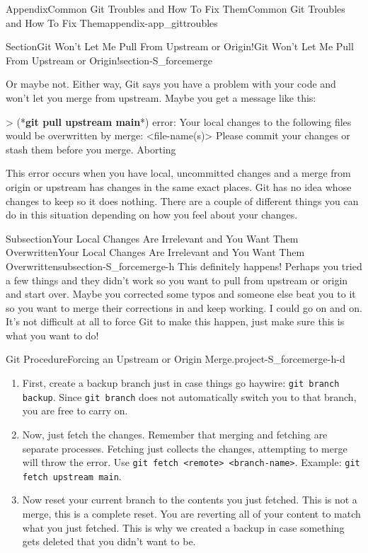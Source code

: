 \documentclass[oneside,10pt,]{book}
\newcommand{\mono}[1]{\texttt{#1}}
\newcommand{\consoleinput}[1]{\textbf{#1}}
\begin{document}
\begin{appendixptx}{Appendix}{Common Git Troubles and How To Fix Them}{}{Common Git Troubles and How To Fix Them}{}{}{appendix-app_gittroubles}
\begin{sectionptx}{Section}{Git Won't Let Me Pull From Upstream or Origin!}{}{Git Won't Let Me Pull From Upstream or Origin!}{}{}{section-S_forcemerge}
\begin{introduction}{}
\par
Or maybe not. Either way, Git says you have a problem with your code and won't let you merge from upstream. Maybe you get a message like this:%
\begin{console}{0}{1}{0}
> (*\consoleinput{git pull upstream main}*)
error: Your local changes to the following files would be overwritten by merge:
        <file-name(s)>
Please commit your changes or stash them before you merge.
Aborting
\end{console}
This error occurs when you have local, uncommitted changes and a merge from origin or upstream has changes in the same exact places. Git has no idea whose changes to keep so it does nothing. There are a couple of different things you can do in this situation depending on how you feel about your changes.%
\end{introduction}%
%
%
\typeout{************************************************}
\typeout{************************************************}
%
\begin{subsectionptx}{Subsection}{Your Local Changes Are Irrelevant and You Want Them Overwritten}{}{Your Local Changes Are Irrelevant and You Want Them Overwritten}{}{}{subsection-S_forcemerge-h}
%
This definitely happens! Perhaps you tried a few things and they didn't work so you want to pull from upstream or origin and start over. Maybe you corrected some typos and someone else beat you to it so you want to merge their corrections in and keep working. I could go on and on. It's not difficult at all to force Git to make this happen, just make sure this is what you want to do!%
\begin{project}{Git Procedure}{Forcing an Upstream or Origin Merge.}{project-S_forcemerge-h-d}%
\begin{enumerate}[font=\bfseries,label=(\alph*),ref=\alph*]%
\item{}First, create a backup branch just in case things go haywire: \mono{git branch backup}. Since \mono{git branch} does not automatically switch you to that branch, you are free to carry on.%
\item{}Now, just fetch the changes. Remember that merging and fetching are separate processes. Fetching just collects the changes, attempting to merge will throw the error. Use \mono{git fetch <remote> <branch-name>}. Example: \mono{git fetch upstream main}.%
\item{}Now reset your current branch to the contents you just fetched. This is not a merge, this is a complete reset. You are reverting all of your content to match what you just fetched. This is why we created a backup in case something gets deleted that you didn't want to be.%

\end{enumerate}
\end{project}
\end{subsectionptx}
\end{sectionptx}
\end{appendixptx}
\end{document}
